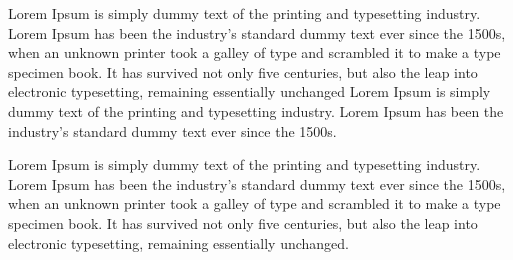 Lorem Ipsum is simply dummy text of the printing and typesetting industry. Lorem Ipsum has been the industry's standard dummy text ever since the 1500s, when an unknown printer took a galley of type and scrambled it to make a type specimen book. It has survived not only five centuries, but also the leap into electronic typesetting, remaining essentially unchanged Lorem Ipsum is simply dummy text of the printing and typesetting industry. Lorem Ipsum has been the industry's standard dummy text ever since the 1500s.

Lorem Ipsum is simply dummy text of the printing and typesetting industry. Lorem Ipsum has been the industry's standard dummy text ever since the 1500s, when an unknown printer took a galley of type and scrambled it to make a type specimen book. It has survived not only five centuries, but also the leap into electronic typesetting, remaining essentially unchanged.
